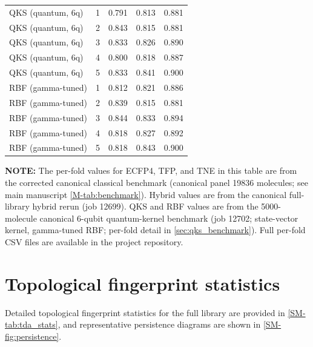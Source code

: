 \documentclass[11pt,a4paper]{article}
\begin{document}
\begin{table}[htbp]
\begin{tabularx}{\textwidth}{l l S[table-format=1.3] S[table-format=1.3] S[table-format=1.3]}
\midrule
QKS (quantum, 6q) & 1 & 0.791 & 0.813 & 0.881 \\
QKS (quantum, 6q) & 2 & 0.843 & 0.815 & 0.881 \\
QKS (quantum, 6q) & 3 & 0.833 & 0.826 & 0.890 \\
QKS (quantum, 6q) & 4 & 0.800 & 0.818 & 0.887 \\
QKS (quantum, 6q) & 5 & 0.833 & 0.841 & 0.900 \\
\midrule
RBF (gamma-tuned) & 1 & 0.812 & 0.821 & 0.886 \\
RBF (gamma-tuned) & 2 & 0.839 & 0.815 & 0.881 \\
RBF (gamma-tuned) & 3 & 0.844 & 0.833 & 0.894 \\
RBF (gamma-tuned) & 4 & 0.818 & 0.827 & 0.892 \\
RBF (gamma-tuned) & 5 & 0.818 & 0.843 & 0.900 \\
\bottomrule
\end{tabularx}
\end{table}

\vspace{2mm}
\noindent\textbf{NOTE:} The per-fold values for ECFP4, TFP, and TNE in this table are from the corrected canonical classical benchmark (canonical panel \num{19836} molecules; see main manuscript \cref{M-tab:benchmark}). Hybrid values are from the canonical full-library hybrid rerun (job 12699). QKS and RBF values are from the \num{5000}-molecule canonical 6-qubit quantum-kernel benchmark (job 12702; state-vector kernel, gamma-tuned RBF; per-fold detail in \cref{sec:qks_benchmark}). Full per-fold CSV files are available in the project repository.

\section{Topological fingerprint statistics}



Detailed topological fingerprint statistics for the full library are provided in \cref{SM-tab:tda_stats}, and representative persistence diagrams are shown in \cref{SM-fig:persistence}.
\end{document}
